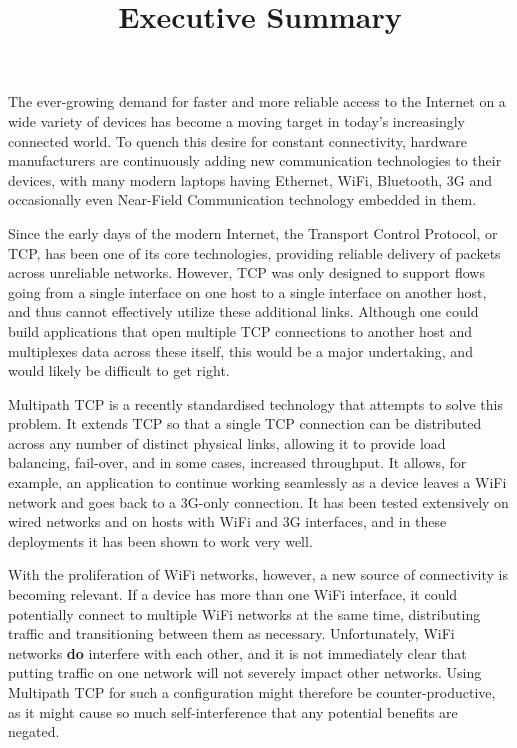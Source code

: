 \documentclass[12pt,a4paper]{article}
\title{\vspace{-5ex}Executive Summary}
\author{\vspace{-5ex}}
\date{\vspace{-5ex}}
\begin{document}
\maketitle
\onehalfspacing
The ever-growing demand for faster and more reliable access to the Internet on a
wide variety of devices has become a moving target in today's increasingly
connected world. To quench this desire for constant connectivity, hardware
manufacturers are continuously adding new communication technologies to their
devices, with many modern laptops having Ethernet, WiFi, Bluetooth, 3G and
occasionally even Near-Field Communication technology embedded in them.

Since the early days of the modern Internet, the Transport Control Protocol, or
TCP, has been one of its core technologies, providing reliable delivery of
packets across unreliable networks. However, TCP was only designed to support
flows going from a single interface on one host to a single interface on another
host, and thus cannot effectively utilize these additional links. Although one
could build applications that open multiple TCP connections to another host and
multiplexes data across these itself, this would be a major undertaking, and
would likely be difficult to get right.

Multipath TCP is a recently standardised technology that attempts to solve this
problem. It extends TCP so that a single TCP connection can be distributed
across any number of distinct physical links, allowing it to provide load
balancing, fail-over, and in some cases, increased throughput. It allows, for
example, an application to continue working seamlessly as a device leaves a WiFi
network and goes back to a 3G-only connection. It has been tested extensively on
wired networks and on hosts with WiFi and 3G interfaces, and in these
deployments it has been shown to work very well.

With the proliferation of WiFi networks, however, a new source of connectivity
is becoming relevant. If a device has more than one WiFi interface, it could
potentially connect to multiple WiFi networks at the same time, distributing
traffic and transitioning between them as necessary. Unfortunately, WiFi
networks \textbf{do} interfere with each other, and it is not immediately clear
that putting traffic on one network will not severely impact other networks.
Using Multipath TCP for such a configuration might therefore be
counter-productive, as it might cause so much self-interference that any
potential benefits are negated.
\end{document}
